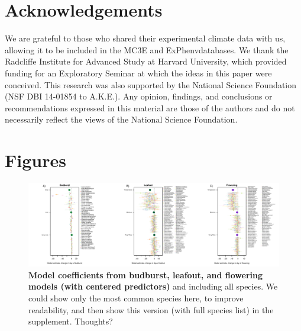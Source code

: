 \documentclass{article}
\begin{document}

\section* {Acknowledgements}

We are grateful to those who shared their experimental climate data with us, allowing it to be included in the MC3E and ExPhenvdatabases. We thank the Radcliffe Institute for Advanced Study at Harvard University, which provided funding for an Exploratory Seminar at which the ideas in this paper were conceived. This research was also supported by the National Science Foundation (NSF DBI 14-01854 to A.K.E.). Any opinion, findings, and conclusions or recommendations expressed in this material are those of the authors and do not necessarily reflect the views of the National Science Foundation.



\section*{Figures}


\begin{figure}[h]
\centering
 \includegraphics{../../Analyses/soilmoisture/figures/m5_bbdlofl.pdf}
 \caption{\textbf{Model coefficients from budburst, leafout, and flowering models (with centered predictors)} and including all species. We could show only the most common species here, to improve readability, and then show this version (with full species list) in the supplement. Thoughts?}  %
 \label{fig:bblofl}
 \end{figure}
 
\end{document}
